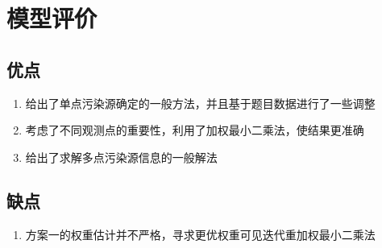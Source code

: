 \documentclass[UTF8]{ctexart}
\begin{document}
\section{模型评价}
\subsection{优点}
\begin{enumerate}
  \item 给出了单点污染源确定的一般方法，并且基于题目数据进行了一些调整
  \item 考虑了不同观测点的重要性，利用了加权最小二乘法，使结果更准确
  \item 给出了求解多点污染源信息的一般解法
\end{enumerate}
\subsection{缺点}
\begin{enumerate}
  \item 方案一的权重估计并不严格，寻求更优权重可见迭代重加权最小二乘法\cite{yuxiaoyan}
\end{enumerate}

  
\end{document}
